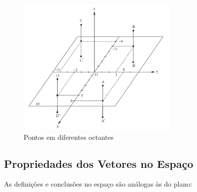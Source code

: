 \begin{figure}[H]
  \centering
  \includegraphics[width=0.7\textwidth]{./fig/fig1.60.png}
  \caption{Pontos em diferentes octantes}
  \label{fig:fig1.60}
\end{figure}

\subsection{Propriedades dos Vetores no Espaço}

As definições e conclusões no espaço são análogas às do plano:

